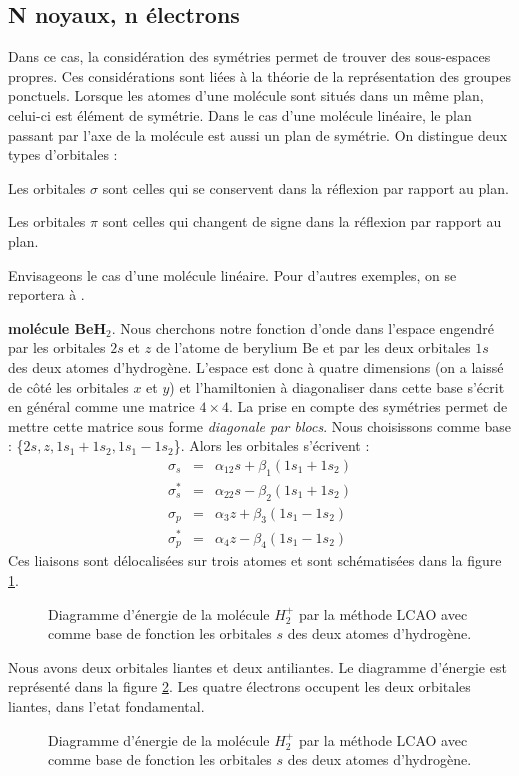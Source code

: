 \documentclass[12pt]{book}
\begin{document}
\subsection{N noyaux, n \'electrons}\label{secnnne}
Dans ce cas, la consid\'eration des sym\'etries permet de trouver des
sous-espaces propres. Ces consid\'erations sont li\'ees \`a la
th\'eorie de la repr\'esentation des groupes ponctuels.
Lorsque les atomes d'une mol\'ecule sont situ\'es dans un m\^eme plan,
celui-ci est \'el\'ement de sym\'etrie. Dans le cas d'une mol\'ecule
lin\'eaire, le plan passant par l'axe de la mol\'ecule est aussi un
plan de sym\'etrie. On distingue deux types
d'orbitales : 
\begin{defn}
Les orbitales $\sigma$ sont celles qui se conservent dans la r\'eflexion
par rapport au plan.
\end{defn}
\begin{defn}
Les orbitales $\pi$ sont celles qui changent de signe dans la r\'eflexion
par rapport au plan.
\end{defn}
Envisageons le cas d'une mol\'ecule lin\'eaire. Pour
d'autres exemples, on se reportera \`a \cite{ph:mecaq:Rivail89}.
\begin{exmp}
{\bf mol\'ecule BeH$_2$}.
Nous cherchons notre fonction d'onde dans l'espace engendr\'e par
les orbitales $2s$ et $z$ de l'atome de berylium Be et par les deux
orbitales $1s$ des deux atomes d'hydrog\`ene. L'espace est donc \`a quatre
dimensions (on a laiss\'e de c\^ot\'e les orbitales $x$ et $y$) et
l'hamiltonien \`a diagonaliser dans cette base s'\'ecrit en
g\'en\'eral comme une matrice $4\times 4$.
La prise en compte des sym\'etries permet de mettre cette matrice sous
forme {\it diagonale par blocs}.
Nous choisissons comme base :
\{$2s,z,1s_1+1s_2,1s_1-1s_2$\}. Alors les orbitales s'\'ecrivent :
\begin{eqnarray}
\sigma_s&=&\alpha_12s+\beta_1(1s_1+1s_2)\\
\sigma_s^*&=&\alpha_22s-\beta_2(1s_1+1s_2)\\
\sigma_p&=&\alpha_3z+\beta_3(1s_1-1s_2)\\
\sigma_p^*&=&\alpha_4z-\beta_4(1s_1-1s_2)
\end{eqnarray}
Ces liaisons sont d\'elocalis\'ees sur trois atomes et sont
sch\'ematis\'ees dans la figure \ref{figBeH2orb}.
\begin{figure}[htb]
 \centerline{}   
 \caption{Diagramme d'\'energie de la mol\'ecule $H_2^+$ par la
m\'ethode LCAO avec comme base de fonction les orbitales $s$ des deux
atomes d'hydrog\`ene.}
 \label{figBeH2orb}
\end{figure}
Nous avons deux orbitales liantes et deux antiliantes. Le diagramme
d'\'energie est repr\'esent\'e dans la figure \ref{figBeH2ene}. Les quatre
\'electrons occupent les deux orbitales liantes, dans l'etat
fondamental. 
\begin{figure}[htb]
 \centerline{}   
 \caption{Diagramme d'\'energie de la mol\'ecule $H_2^+$ par la
m\'ethode LCAO avec comme base de fonction les orbitales $s$ des deux
atomes d'hydrog\`ene.}
 \label{figBeH2ene}
\end{figure}
\end{exmp}
\end{document}
